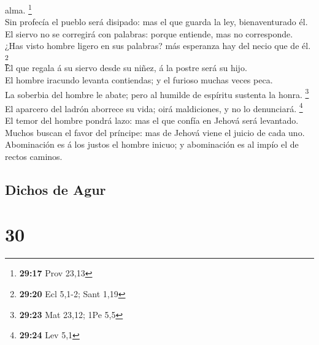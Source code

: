 alma. \footnote{\textbf{29:17} Prov 23,13}\\
 Sin profecía el pueblo será disipado: mas el que guarda la
ley, bienaventurado él.\\
 El siervo no se corregirá con palabras: porque entiende,
mas no corresponde.\\
 ¿Has visto hombre ligero en sus palabras? más esperanza
hay del necio que de él. \footnote{\textbf{29:20} Ecl 5,1-2; Sant 1,19}\\
 El que regala á su siervo desde su niñez, á la postre será
su hijo.\\
 El hombre iracundo levanta contiendas; y el furioso muchas
veces peca.\\
 La soberbia del hombre le abate; pero al humilde de
espíritu sustenta la honra. \footnote{\textbf{29:23} Mat 23,12; 1Pe 5,5}\\
 El aparcero del ladrón aborrece su vida; oirá maldiciones,
y no lo denunciará. \footnote{\textbf{29:24} Lev 5,1}\\
 El temor del hombre pondrá lazo: mas el que confía en
Jehová será levantado.\\
 Muchos buscan el favor del príncipe: mas de Jehová viene
el juicio de cada uno.\\
 Abominación es á los justos el hombre inicuo; y
abominación es al impío el de rectos caminos.

\hypertarget{dichos-de-agur}{%
\subsection{Dichos de Agur}\label{dichos-de-agur}}

\hypertarget{section-29}{%
\section{30}\label{section-29}}

